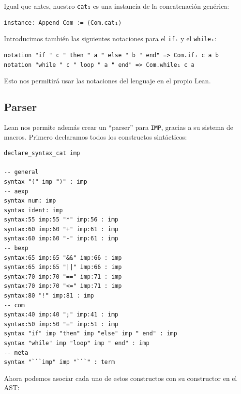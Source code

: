 \documentclass[../main.tex]{subfiles}
\begin{document}
Igual que antes, nuestro \texttt{cat₁} es una instancia de la concatenación
genérica:

\begin{verbatim}
instance: Append Com := ⟨Com.cat₁⟩
\end{verbatim}

Introducimos también las siguientes notaciones para el \texttt{if₁} y el
\texttt{while₁}:

\begin{verbatim}
notation "if " c " then " a " else " b " end" => Com.if₁ c a b
notation "while " c " loop " a " end" => Com.while₁ c a
\end{verbatim}

Esto nos permitirá usar las notaciones del lenguaje en el propio Lean.

\subsection{Parser}

Lean nos permite además crear un \enquote{parser} para \texttt{IMP}, gracias
a su sistema de macros. Primero declaramos todos los constructos sintácticos:

\begin{verbatim}
declare_syntax_cat imp

-- general
syntax "(" imp ")" : imp
-- aexp
syntax num: imp
syntax ident: imp
syntax:55 imp:55 "*" imp:56 : imp
syntax:60 imp:60 "+" imp:61 : imp
syntax:60 imp:60 "-" imp:61 : imp
-- bexp
syntax:65 imp:65 "&&" imp:66 : imp
syntax:65 imp:65 "||" imp:66 : imp
syntax:70 imp:70 "==" imp:71 : imp
syntax:70 imp:70 "<=" imp:71 : imp
syntax:80 "!" imp:81 : imp
-- com
syntax:40 imp:40 ";" imp:41 : imp
syntax:50 imp:50 "=" imp:51 : imp
syntax "if" imp "then" imp "else" imp " end" : imp
syntax "while" imp "loop" imp " end" : imp
-- meta
syntax "```imp" imp "```" : term
\end{verbatim}

Ahora podemos asociar cada uno de estos constructos con su constructor en el
AST:
\end{document}
